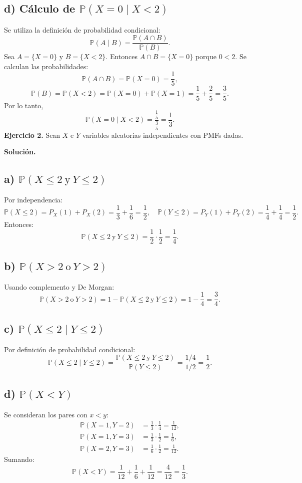 \documentclass[letterpaper, 12pt]{article}
\begin{document}
    \subsection*{d) Cálculo de \(\mathbb{P}(X = 0 \mid X < 2)\)}
    Se utiliza la definición de probabilidad condicional:
    \[
    \mathbb{P}(A \mid B) = \frac{\mathbb{P}(A \cap B)}{\mathbb{P}(B)}.
    \]
    Sea \(A = \{X = 0\}\) y \(B = \{X < 2\}\). Entonces \(A \cap B = \{X = 0\}\) porque \(0 < 2\). Se calculan las probabilidades:
    \[
    \mathbb{P}(A \cap B) = \mathbb{P}(X = 0) = \frac{1}{5},
    \]
    \[
    \mathbb{P}(B) = \mathbb{P}(X < 2) = \mathbb{P}(X = 0) + \mathbb{P}(X = 1) = \frac{1}{5} + \frac{2}{5} = \frac{3}{5}.
    \]
    Por lo tanto,
    \[
    \mathbb{P}(X = 0 \mid X < 2) = \frac{\frac{1}{5}}{\frac{3}{5}} = \frac{1}{3}.
    \]
    \newpage
    \textbf{Ejercicio 2.} Sean \( X \) e \( Y \) variables aleatorias independientes con PMFs dadas.

    \textbf{Solución.}

    \subsection*{a) \(\mathbb{P}(X \leq 2 \ \text{y} \ Y \leq 2)\)}
    Por independencia:
    \[
    \mathbb{P}(X \leq 2) = P_X(1)+P_X(2) = \frac{1}{3}+\frac{1}{6} = \frac{1}{2},
    \quad
    \mathbb{P}(Y \leq 2) = P_Y(1)+P_Y(2) = \frac{1}{4}+\frac{1}{4} = \frac{1}{2}.
    \]
    Entonces:
    \[
    \mathbb{P}(X \leq 2 \ \text{y} \ Y \leq 2) = \frac{1}{2} \cdot \frac{1}{2} = \frac{1}{4}.
    \]

    \subsection*{b) \(\mathbb{P}(X > 2 \ \text{o} \ Y > 2)\)}
    Usando complemento y De Morgan:
    \[
    \mathbb{P}(X > 2 \ \text{o} \ Y > 2) = 1 - \mathbb{P}(X \leq 2 \ \text{y} \ Y \leq 2) = 1 - \frac{1}{4} = \frac{3}{4}.
    \]

    \subsection*{c) \(\mathbb{P}(X \leq 2 \mid Y \leq 2)\)}
    Por definición de probabilidad condicional:
    \[
    \mathbb{P}(X \leq 2 \mid Y \leq 2) = \frac{\mathbb{P}(X \leq 2 \ \text{y} \ Y \leq 2)}{\mathbb{P}(Y \leq 2)} = \frac{1/4}{1/2} = \frac{1}{2}.
    \]

    \subsection*{d) \(\mathbb{P}(X < Y)\)}
    Se consideran los pares con \(x < y\):
    \[
    \begin{aligned}
    \mathbb{P}(X=1,Y=2) &= \frac{1}{3}\cdot\frac{1}{4} = \frac{1}{12},\\
    \mathbb{P}(X=1,Y=3) &= \frac{1}{3}\cdot\frac{1}{2} = \frac{1}{6},\\
    \mathbb{P}(X=2,Y=3) &= \frac{1}{6}\cdot\frac{1}{2} = \frac{1}{12}.
    \end{aligned}
    \]
    Sumando:
    \[
    \mathbb{P}(X < Y) = \frac{1}{12}+\frac{1}{6}+\frac{1}{12} = \frac{4}{12} = \frac{1}{3}.
    \]
\end{document}
